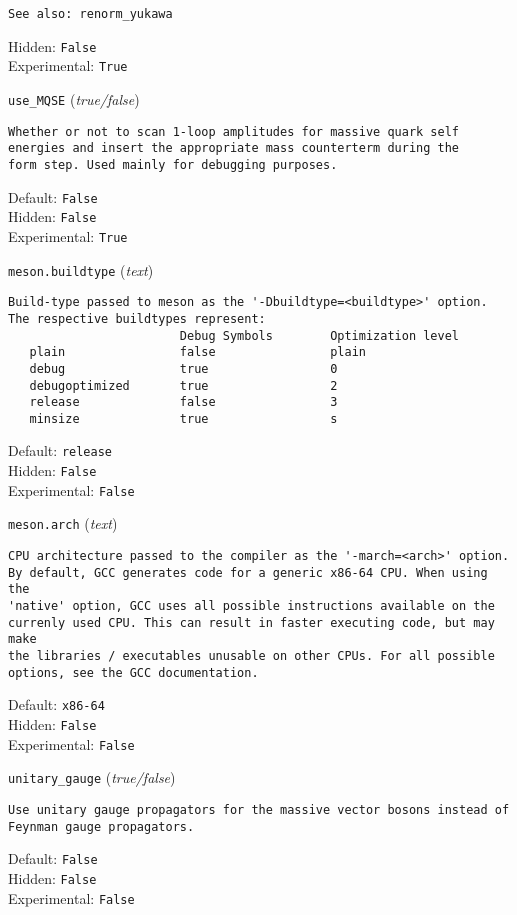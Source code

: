 \begin{basedescript}{\desclabelstyle{\pushlabel}}
\begin{verbatim}
See also: renorm_yukawa
\end{verbatim}
Hidden: \verb|False|
\\Experimental: \verb|True|
\\\item[\colorbox{gray!30}{\texttt{use\_MQSE}}] (\textit{true/false})
\begin{verbatim}
Whether or not to scan 1-loop amplitudes for massive quark self
energies and insert the appropriate mass counterterm during the
form step. Used mainly for debugging purposes.
\end{verbatim}
Default: \verb|False|
\\Hidden: \verb|False|
\\Experimental: \verb|True|
\\\item[\colorbox{gray!30}{\texttt{meson.buildtype}}] (\textit{text})
\begin{verbatim}
Build-type passed to meson as the '-Dbuildtype=<buildtype>' option.
The respective buildtypes represent:
                        Debug Symbols        Optimization level
   plain                false                plain
   debug                true                 0
   debugoptimized       true                 2
   release              false                3
   minsize              true                 s
\end{verbatim}
Default: \verb|release|
\\Hidden: \verb|False|
\\Experimental: \verb|False|
\\\item[\colorbox{gray!30}{\texttt{meson.arch}}] (\textit{text})
\begin{verbatim}
CPU architecture passed to the compiler as the '-march=<arch>' option.
By default, GCC generates code for a generic x86-64 CPU. When using the
'native' option, GCC uses all possible instructions available on the
currenly used CPU. This can result in faster executing code, but may make
the libraries / executables unusable on other CPUs. For all possible
options, see the GCC documentation.
\end{verbatim}
Default: \verb|x86-64|
\\Hidden: \verb|False|
\\Experimental: \verb|False|
\\\item[\colorbox{gray!30}{\texttt{unitary\_gauge}}] (\textit{true/false})
\begin{verbatim}
Use unitary gauge propagators for the massive vector bosons instead of
Feynman gauge propagators.
\end{verbatim}
Default: \verb|False|
\\Hidden: \verb|False|
\\Experimental: \verb|False|
\\\end{basedescript}
